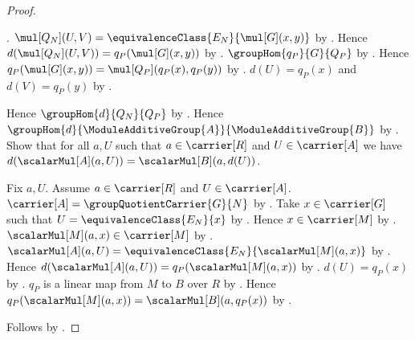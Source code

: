 \begin{proof}
\begin{subproof}
            .
        $\mul[Q_N](U,V)=
            \equivalenceClass{E_N}{\mul[G](x,y)}$ by
            .
        Hence $d(\mul[Q_N](U,V))=q_P(\mul[G](x,y))$ by
            .
        $\groupHom{q_P}{G}{Q_P}$ by
            .
        Hence $q_P(\mul[G](x,y))=\mul[Q_P](q_P(x),q_P(y))$ by
            .
        $d(U)=q_P(x)$ and $d(V)=q_P(y)$ by
            .
    \end{subproof}
    Hence $\groupHom{d}{Q_N}{Q_P}$ by .
    Hence $\groupHom{d}{\ModuleAdditiveGroup{A}}{
        \ModuleAdditiveGroup{B}}$ by \auto.
    Show that for all $a,U$ such that $a\in\carrier[R]$ and
        $U\in\carrier[A]$ we have
        $d(\scalarMul[A](a,U))=\scalarMul[B](a,d(U))$.
    \begin{subproof}
        Fix $a,U$.
        Assume $a\in\carrier[R]$ and $U\in\carrier[A]$.
        $\carrier[A]=\groupQuotientCarrier{G}{N}$ by
            .
        Take $x\in\carrier[G]$ such that
            $U=\equivalenceClass{E_N}{x}$ by
            .
        Hence $x\in\carrier[M]$ by
            .
        $\scalarMul[M](a,x)\in\carrier[M]$ by
            .
        $\scalarMul[A](a,U)=
            \equivalenceClass{E_N}{\scalarMul[M](a,x)}$ by
            .
        Hence $d(\scalarMul[A](a,U))
            =q_P(\scalarMul[M](a,x))$ by
            .
        $d(U)=q_P(x)$ by
            .
        $q_P$ is a linear map from $M$ to $B$ over $R$ by
            .
        Hence $q_P(\scalarMul[M](a,x))
            =\scalarMul[B](a,q_P(x))$ by
            .
    \end{subproof}
    Follows by .
\end{proof}

